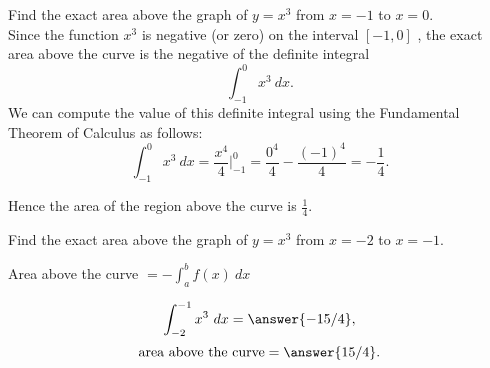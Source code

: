 \documentclass{ximera}
\begin{document}
\begin{example}
Find the exact area above the graph of $y = x^3$ from $x = -1$ to $x = 0$. \\
Since the function $x^3$ is negative (or zero) on the interval $[-1, 0]$ , the exact area above the curve is the negative of the definite integral 
\[\int_{-1}^0 x^3 \ dx.\]
We can compute the value of this definite integral using the Fundamental Theorem of Calculus as follows:
\[\int_{-1}^0 x^3 \ dx = \frac{x^4}{4} \Big|_{-1}^0 = \frac{0^4}{4} - \frac{(-1)^4}{4} = -\frac14.\]

Hence the area of the region above the curve is $\frac14$.


\begin{image}
\end{image}
\end{example}


\begin{problem}
Find the exact area above the graph of $y = x^3$ from $x = -2$ to $x = -1$. \\
\begin{hint}
Area above the curve $= -\int_a^b f(x) \ dx$
\end{hint}
\[\int_{-2}^{-1} x^3 \ dx = \answer{-15/4},\]
\[\text{area above the curve} = \answer{15/4}.\]
\end{problem}
\end{document}
